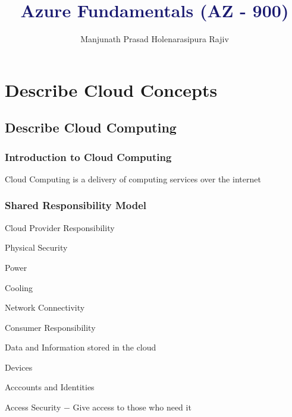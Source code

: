 \documentclass[12pt,a4paper]{report}
\begin{document}
\title{\textcolor{MidnightBlue}{\textbf{\Huge Azure Fundamentals (AZ - 900)}}}
\author{\Large Manjunath Prasad Holenarasipura Rajiv}
\maketitle
\tableofcontents
\clearpage
\chapter{Describe Cloud Concepts}
\section{Describe Cloud Computing}
\subsection{Introduction to Cloud Computing}
\begin{mylist1}
    \item Cloud Computing is a delivery of computing services
    over the internet
\end{mylist1}
\subsection{Shared Responsibility Model}
\begin{mylist1}
    \item Cloud Provider Responsibility
    \begin{mylist2}
        \item Physical Security
        \item Power
        \item Cooling
        \item Network Connectivity
    \end{mylist2}
    \item Consumer Responsibility
    \begin{mylist2}
        \item Data and Information stored in the cloud
        \item Devices
        \item Acccounts and Identities
        \item Access Security $-$ Give access to those who need it
    \end{mylist2}
\end{mylist1}
\end{document}
